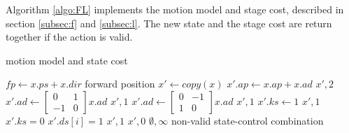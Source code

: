 \documentclass[conference]{IEEEtran}
\begin{document}
Algorithm \ref{algo:FL} implements 
the motion model and stage cost, 
described in section \ref{subsec:f} and \ref{subsec:l}.
The new state and the stage cost are return together if the action is valid.
\begin{algorithm}
    \caption{motion model and state cost}
    \label{algo:FL}
    \begin{algorithmic}[1] %
        \State $fp \gets x.ps + x.dir$ 
        \Comment forward position
        \State $x' \gets copy(x)$
          \label{line:MF}
            \State $x'.ap \gets x.ap + x.ad$
            \State \Return $x', 2$
            \State $x'.ad \gets \left[ \begin{matrix}0&1\\ -1&0\end{matrix} \right]  x.ad$
            \State \Return $x', 1$
            \State $x'.ad \gets \left[ \begin{matrix}0&-1\\ 1&0\end{matrix} \right]  x.ad$
            \State \Return $x', 1$
         \label{line:PK}
            \State $x'.ks \gets 1$
            \State \Return $x', 1$
         \label{line:UD}
            \State $x'.ks = 0$
            \State $x'.ds[i] = 1$
            \State \Return $x', 1$
         \label{line:ST}
            \State \Return $x', 0$
        \EndIf
        \State \Return $\emptyset, \infty$
        \Comment non-valid state-control combination
    \EndProcedure
    \end{algorithmic}
\end{algorithm}
\end{document}
